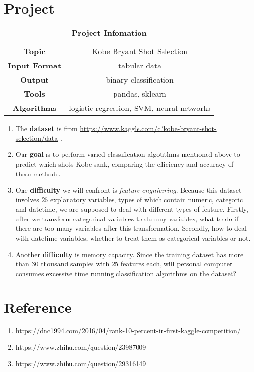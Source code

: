 \documentclass[a4paper,11pt,onecolumn,twoside]{article}
\begin{document}
\section{Project}
\begin{table}[H]
	\centering
	\caption*{\textbf{Project Infomation}}
	\begin{tabular}{cc}
		\midrule[1.5pt]
		\textbf{Topic}& Kobe Bryant Shot Selection\\	
		\textbf{Input Format}&tabular data\\
		\textbf{Output}&binary classification\\
		\textbf{Tools}&pandas, sklearn\\
		\textbf{Algorithms}&logistic regression, SVM, neural networks\\
		\midrule[1.5pt]
	\end{tabular}
\end{table}
\begin{enumerate}
	\item The \textbf{dataset} is from \url{https://www.kaggle.com/c/kobe-bryant-shot-selection/data} .
	\item Our \textbf{goal} is to perform varied classification algotithms mentioned above to predict which shots Kobe sank, comparing the efficiency and accuracy of these methods.\par
	\item One \textbf{difficulty} we will confront is \textit{feature engnieering}. Because this dataset involves $25$ explanatory variables, types of which contain numeric, categoric and datetime, we are supposed to deal with different types of feature. Firstly, after we transform categorical variables to dummy variables, what to do if there are too many variables after this transformation. Secondly, how to deal with datetime variables, whether to treat them as categorical variables or not.\par
	\item Another \textbf{difficulty }is memory capacity. Since the training dataset has more than 30 thousand samples with 25 features each, will personal computer consumes excessive time running classification algorithms on the dataset?\par
\end{enumerate}
\section{Reference}
\begin{enumerate}
	\item \url{https://dnc1994.com/2016/04/rank-10-percent-in-first-kaggle-competition/}
	\item \url{https://www.zhihu.com/question/23987009}
	\item \url{https://www.zhihu.com/question/29316149}
\end{enumerate}
\end{document}
